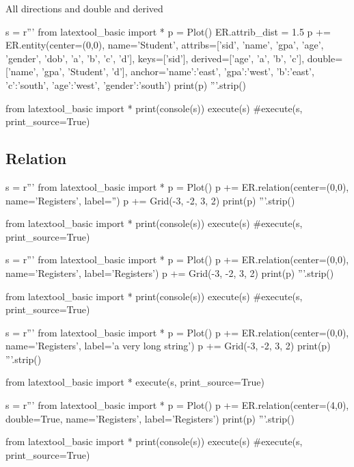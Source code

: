 \newpage
All directions and double and derived
\begin{python}
s = r'''
from latextool_basic import *
p = Plot()
ER.attrib_dist = 1.5
p += ER.entity(center=(0,0),
          name='Student',
          attribs=['sid', 'name', 'gpa', 'age', 'gender', 'dob', 'a', 'b', 'c', 'd'],
          keys=['sid'],
          derived=['age', 'a', 'b', 'c'],
          double=['name', 'gpa', 'Student', 'd'],
          anchor={'name':'east', 'gpa':'west', 'b':'east', 'c':'south',
                  'age':'west', 'gender':'south'})
print(p)
'''.strip()

from latextool_basic import *
print(console(s))
execute(s)
#execute(s, print_source=True)
\end{python}



\newpage
\subsection{Relation}

\begin{python}
s = r'''
from latextool_basic import *
p = Plot()
p += ER.relation(center=(0,0), name='Registers', label='')
p += Grid(-3, -2, 3, 2)
print(p)
'''.strip()

from latextool_basic import *
print(console(s))
execute(s)
#execute(s, print_source=True)
\end{python}

\begin{python}
s = r'''
from latextool_basic import *
p = Plot()
p += ER.relation(center=(0,0), name='Registers', label='Registers')
p += Grid(-3, -2, 3, 2)
print(p)
'''.strip()

from latextool_basic import *
print(console(s))
execute(s)
#execute(s, print_source=True)
\end{python}

\begin{python}
s = r'''
from latextool_basic import *
p = Plot()
p += ER.relation(center=(0,0), name='Registers', label='a very long string')
p += Grid(-3, -2, 3, 2)
print(p)
'''.strip()

from latextool_basic import *
execute(s, print_source=True)
\end{python}

\begin{python}
s = r'''
from latextool_basic import *
p = Plot()
p += ER.relation(center=(4,0), double=True,
                 name='Registers', label='Registers')
print(p)
'''.strip()

from latextool_basic import *
print(console(s))
execute(s)
#execute(s, print_source=True)
\end{python}


